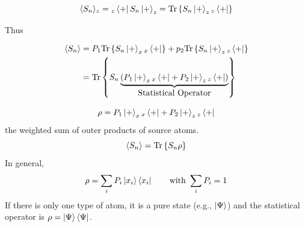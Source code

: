 \documentclass[english, 11pt]{article}
\begin{document}
      \[ \E{S_n}_z = {}_z\bp S_n\kp_z = \tr{S_n\kp_z {}_z\bp} \]

      Thus

      \begin{align*}
        \E{S_n} & = P_1\tr{S_n\kp_x {}_x\bp} + p_2\tr{S_n\kp_z {}_z\bp} \\
                & = \tr{S_n \underbrace{\left( P_1\kp_x{}_x\bp + P_2\kp_z{}_z\bp \right)}_{\mbox{Statistical Operator}}}
      \end{align*}

      \begin{defn}\label{statistical_operator}
        \[ \rho = P_1\kp_x {}_x\bp + P_2\kp_z {}_z\bp \]
        the weighted sum of outer products of source atoms.
        \[ \E{S_n} = \tr{S_n\rho} \]
        In general,
        \[ \rho = \sum_i P_i \ket{x_i}\bra{x_i} \ \ \ \ \ \ \mbox{with } \sum_i P_i = 1 \]
        If there is only one type of atom, it is a pure state (e.g., $\ket{\Psi}$) and the statistical operator is $\rho = \ket{\Psi}\bra{\Psi}$.
      \end{defn}

\end{document}
